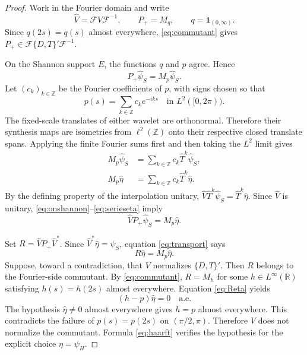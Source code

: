 \documentclass[11pt]{article}
\newcommand{\F}{\mathcal F}
\begin{document}
\begin{proof}
Work in the Fourier domain and write
\[
 \widehat V=\F V\F^{-1},\qquad
 P_+=M_q,\qquad q=\mathbf1_{(0,\infty)}.
\]
Since $q(2s)=q(s)$ almost everywhere, \eqref{eq:commutant} gives
$P_+\in\F\{D,T\}'\F^{-1}$.

On the Shannon support $E$, the functions $q$ and $p$ agree.  Hence
\begin{equation}\label{eq:onshannon}
 P_+\widehat\psi_S=M_p\widehat\psi_S.
\end{equation}
Let $(c_k)_{k\in\mathbb Z}$ be the Fourier coefficients of $p$, with signs
chosen so that
\[
 p(s)=\sum_{k\in\mathbb Z}c_ke^{-iks}
 \quad\text{in }L^2([0,2\pi)).
\]
The fixed-scale translates of either wavelet are orthonormal.  Therefore their
synthesis maps are isometries from $\ell^2(\mathbb Z)$ onto their respective
closed translate spans.  Applying the finite Fourier sums first and then taking
the $L^2$ limit gives
\begin{align}
 M_p\widehat\psi_S
   &=\sum_{k\in\mathbb Z}c_k\widehat T^k\widehat\psi_S,
   \label{eq:seriesS}\\
 M_p\widehat\eta
   &=\sum_{k\in\mathbb Z}c_k\widehat T^k\widehat\eta.
   \label{eq:serieseta}
\end{align}
By the defining property of the interpolation unitary,
$\widehat V\widehat T^k\widehat\psi_S
=\widehat T^k\widehat\eta$.  Since $\widehat V$ is unitary,
\eqref{eq:onshannon}--\eqref{eq:serieseta} imply
\begin{equation}\label{eq:transport}
 \widehat V P_+\widehat\psi_S=M_p\widehat\eta.
\end{equation}

Set $R=\widehat V P_+\widehat V^*$.  Since
$\widehat V^*\widehat\eta=\widehat\psi_S$, equation
\eqref{eq:transport} says
\begin{equation}\label{eq:Reta}
 R\widehat\eta=M_p\widehat\eta.
\end{equation}
Suppose, toward a contradiction, that $V$ normalizes $\{D,T\}'$.  Then $R$
belongs to the Fourier-side commutant.  By \eqref{eq:commutant}, $R=M_h$ for
some $h\in L^\infty(\mathbb R)$ satisfying $h(s)=h(2s)$ almost everywhere.
Equation \eqref{eq:Reta} yields
\[
 (h-p)\widehat\eta=0\quad\text{a.e.}
\]
The hypothesis $\widehat\eta\ne0$ almost everywhere gives $h=p$ almost
everywhere.  This contradicts the failure of
$p(s)=p(2s)$ on $(\pi/2,\pi)$.  Therefore $V$ does not normalize the
commutant.  Formula \eqref{eq:haarft} verifies the hypothesis for the explicit
choice $\eta=\psi_H$.
\end{proof}
\end{document}
